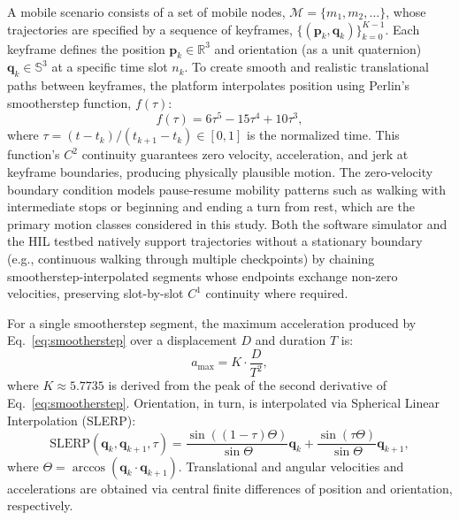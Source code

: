 \documentclass[fleqn,10pt]{wlscirep}
\newcommand{\rev}[1]{{\color{revblue}#1}}
\begin{document}
A mobile scenario consists of a set of mobile nodes, $\mathcal{M} = \{m_1, m_2, \dots\}$, whose trajectories are specified by a sequence of keyframes, $\{(\mathbf{p}_k, \mathbf{q}_k)\}_{k=0}^{K-1}$. Each keyframe defines the position $\mathbf{p}_k \in \mathbb{R}^3$ and orientation (as a unit quaternion) $\mathbf{q}_k \in \mathbb{S}^3$ at a specific time slot $n_k$. To create smooth and realistic translational paths between keyframes, the platform interpolates position using Perlin's smootherstep function\cite{Perlin2002}, $f(\tau)$:
\begin{equation}
f(\tau) = 6\tau^5 - 15\tau^4 + 10\tau^3,
\label{eq:smootherstep}
\end{equation}
where $\tau = (t - t_k) / (t_{k+1} - t_k) \in [0, 1]$ is the normalized time. This function's $C^2$ continuity guarantees zero velocity, acceleration, and jerk at keyframe boundaries, producing physically plausible motion. \rev{The zero-velocity boundary condition models pause-resume mobility patterns such as walking with intermediate stops or beginning and ending a turn from rest, which are the primary motion classes considered in this study. Both the software simulator and the HIL testbed natively support trajectories without a stationary boundary (e.g., continuous walking through multiple checkpoints) by chaining smootherstep-interpolated segments whose endpoints exchange non-zero velocities, preserving slot-by-slot $C^1$ continuity where required.}

\rev{For a single smootherstep segment,} the maximum acceleration \rev{produced by Eq.~\eqref{eq:smootherstep}} over a displacement $D$ \rev{and} duration $T$ is:
\begin{equation}
    a_{\max} = K \cdot \frac{D}{T^2},
\end{equation}
where $K \approx 5.7735$ is derived from the peak of the second derivative of Eq.~\eqref{eq:smootherstep}. Orientation, in turn, is interpolated via Spherical Linear Interpolation (SLERP)\rev{\cite{Shoemake1985SLERP}}:
\begin{equation}
    \text{SLERP}(\mathbf{q}_k, \mathbf{q}_{k+1}, \tau) = \frac{\sin((1-\tau)\Theta)}{\sin\Theta}\mathbf{q}_k + \frac{\sin(\tau\Theta)}{\sin\Theta}\mathbf{q}_{k+1},
\end{equation}
where $\Theta = \arccos(\mathbf{q}_k \cdot \mathbf{q}_{k+1})$. Translational and angular velocities and accelerations are obtained via central finite differences of position and orientation, respectively.
\end{document}
